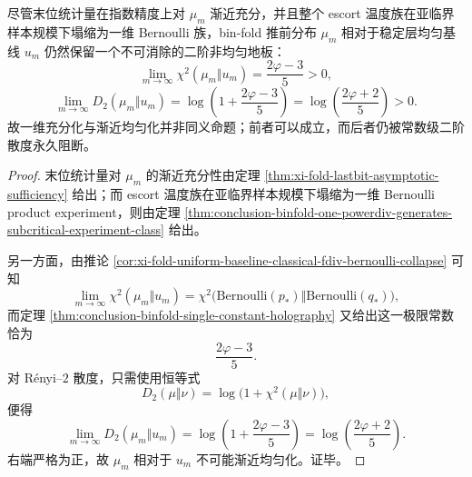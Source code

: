 \begin{theorem}[一维充分化并不蕴含渐近均匀化]\label{thm:conclusion-binfold-sufficiency-does-not-imply-uniformization}
尽管末位统计量在指数精度上对 \(\mu_m\) 渐近充分，并且整个 escort 温度族在亚临界样本规模下塌缩为一维 Bernoulli 族，bin-fold 推前分布 \(\mu_m\) 相对于稳定层均匀基线 \(u_m\) 仍然保留一个不可消除的二阶非均匀地板：
\[
\lim_{m\to\infty}\chi^2(\mu_m\Vert u_m)=\frac{2\varphi-3}{5}>0,
\]
\[
\lim_{m\to\infty}D_2(\mu_m\Vert u_m)
=
\log\!\left(1+\frac{2\varphi-3}{5}\right)
=
\log\!\left(\frac{2\varphi+2}{5}\right)
>0.
\]
故一维充分化与渐近均匀化并非同义命题；前者可以成立，而后者仍被常数级二阶散度永久阻断。
\end{theorem}
\begin{proof}
末位统计量对 \(\mu_m\) 的渐近充分性由定理 \ref{thm:xi-fold-lastbit-asymptotic-sufficiency} 给出；而 escort 温度族在亚临界样本规模下塌缩为一维 Bernoulli product experiment，则由定理 \ref{thm:conclusion-binfold-one-powerdiv-generates-subcritical-experiment-class} 给出。

另一方面，由推论 \ref{cor:xi-fold-uniform-baseline-classical-fdiv-bernoulli-collapse} 可知
\[
\lim_{m\to\infty}\chi^2(\mu_m\Vert u_m)
=
\chi^2\!\bigl(\mathrm{Bernoulli}(p_\ast)\Vert \mathrm{Bernoulli}(q_\ast)\bigr),
\]
而定理 \ref{thm:conclusion-binfold-single-constant-holography} 又给出这一极限常数恰为
\[
\frac{2\varphi-3}{5}.
\]
对 Rényi--\(2\) 散度，只需使用恒等式
\[
D_2(\mu\Vert \nu)=\log\bigl(1+\chi^2(\mu\Vert \nu)\bigr),
\]
便得
\[
\lim_{m\to\infty}D_2(\mu_m\Vert u_m)
=
\log\!\left(1+\frac{2\varphi-3}{5}\right)
=
\log\!\left(\frac{2\varphi+2}{5}\right).
\]
右端严格为正，故 \(\mu_m\) 相对于 \(u_m\) 不可能渐近均匀化。证毕。
\end{proof}

